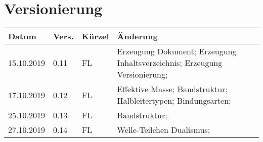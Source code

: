\newpage
\tableofcontents

\section*{Versionierung}
\begin{tabular}{|p{2cm}|p{1cm}|p{1.5cm}|p{10.5cm}|}\hline
Datum & Vers. & Kürzel & Änderung \\ \hline
15.10.2019 & 0.11 & FL & Erzeugung Dokument; Erzeugung Inhaltsverzeichnis; Erzeugung Versionierung; \\ \hline
17.10.2019 & 0.12 & FL & Effektive Masse; Bandstruktur; Halbleitertypen;  Bindungsarten; \\ \hline
25.10.2019 & 0.13 & FL & Bandstruktur; \\ \hline
27.10.2019 & 0.14 & FL & Welle-Teilchen Dualismus; \\ \hline
\end{tabular}
\listoffigures